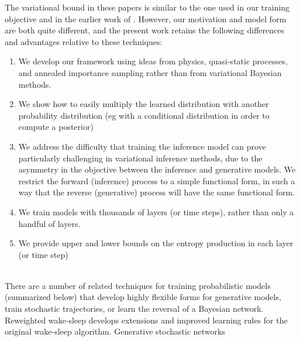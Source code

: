\documentclass{article}
\begin{document}
The variational bound in these papers 
is similar to the one used in our training objective and in the earlier work of \cite{sminchisescu2006learning}.
However, our motivation and model form are both quite different, and the present work 
retains the following differences and advantages relative to these techniques:\\[-2.0em]
\begin{enumerate}\itemsep1pt \parskip0pt 
	\item We develop our framework using ideas from physics, quasi-static processes, and annealed importance sampling rather than  
from variational Bayesian methods.
	\item We show how to easily multiply the learned distribution with another probability distribution (eg with a conditional distribution in order to 
compute a posterior)
	\item We address the difficulty that training the inference model can prove particularly challenging in variational inference methods, due to the asymmetry in the objective between the inference and generative models. We restrict the forward (inference) 
process to a simple functional form, in such a way that the reverse (generative) process will have the same functional form.
	\item We train models with thousands of layers (or time steps), rather than only a handful of layers.
	\item We provide upper and lower bounds on the entropy production in each layer (or time step)
\end{enumerate}
~\\[-1.7em]
There are a number of related techniques for training probabilistic models (summarized below) that develop highly flexible forms for generative models,
train stochastic trajectories, or learn the reversal of a Bayesian network.
Reweighted wake-sleep \cite{Bornschein2014} develops extensions and improved learning rules for the original wake-sleep algorithm.
Generative stochastic networks \cite{bengio2013deep,yao2014equivalence} 
\end{document}
